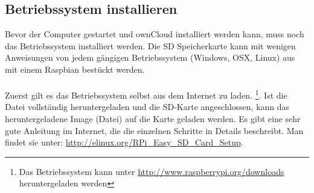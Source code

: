 \subsection{Betriebssystem installieren}
Bevor der Computer gestartet und ownCloud installiert werden kann, muss noch das Betriebssystem installiert werden. 
Die SD Speicherkarte kann mit wenigen Anweisungen von jedem gängigen Betriebssystem (Windows, OSX, Linux) aus mit einem Raspbian bestückt werden.
\\
\\
Zuerst gilt es das Betriebssystem selbst aus dem Internet zu laden.
\footnote{Das Betriebssystem kann unter \url{http://www.raspberrypi.org/downloads} heruntergeladen werden}.
Ist die Datei vollständig heruntergeladen und die SD-Karte angeschlossen, kann das heruntergeladene Image (Datei) auf die Karte geladen werden.
Es gibt eine sehr gute Anleitung im Internet, die die einzelnen Schritte in Details beschreibt. Man findet sie unter: \url{http://elinux.org/RPi\_Easy\_SD\_Card\_Setup}.
